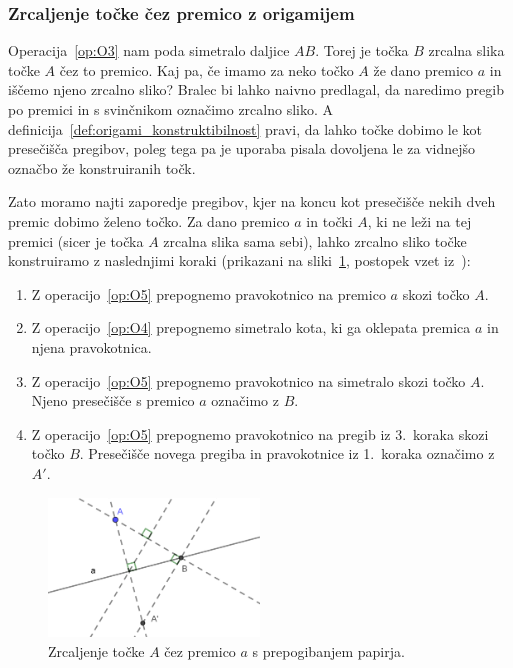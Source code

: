 \subsubsection{Zrcaljenje točke čez premico z origamijem}
\label{zrcaljenje_origami}

Operacija~\ref{op:O3} nam poda simetralo daljice $AB$. Torej je točka $B$ zrcalna slika točke $A$ čez to premico. Kaj pa, če imamo za neko točko $A$ že dano premico $a$ in iščemo njeno zrcalno sliko? Bralec bi lahko naivno predlagal, da naredimo pregib po premici in s svinčnikom označimo zrcalno sliko. A definicija~\ref{def:origami_konstruktibilnost} pravi, da lahko točke dobimo le kot presečišča pregibov, poleg tega pa je uporaba pisala dovoljena le za vidnejšo označbo že konstruiranih točk.

Zato moramo najti zaporedje pregibov, kjer na koncu kot presečišče nekih dveh premic dobimo želeno točko. Za dano premico $a$ in točki $A$, ki ne leži na tej premici (sicer je točka $A$ zrcalna slika sama sebi), lahko zrcalno sliko točke konstruiramo z naslednjimi koraki (prikazani na sliki~\ref{fig:zrcaljenje_cez_premico}, postopek vzet iz~\cite[str.\ 28]{hull2020}):
\begin{enumerate}
    \item Z operacijo~\ref{op:O5} prepognemo pravokotnico na premico $a$ skozi točko $A$.
    \item Z operacijo~\ref{op:O4} prepognemo simetralo kota, ki ga oklepata premica $a$ in njena pravokotnica.
    \item Z operacijo~\ref{op:O5} prepognemo pravokotnico na simetralo skozi točko $A$. Njeno presečišče s premico $a$ označimo z $B$.
    \item Z operacijo~\ref{op:O5} prepognemo pravokotnico na pregib iz 3.\ koraka skozi točko $B$. Presečišče novega pregiba in pravokotnice iz 1.\ koraka označimo z $A'$.
\end{enumerate}

\begin{figure}[h]
    \centering
    \includegraphics[width=0.5\textwidth]{images/zrcaljenje_tocke_cez_premico.png}
    \caption[Zrcaljenje čez premico]{Zrcaljenje točke $A$ čez premico $a$ s prepogibanjem papirja.}
    \label{fig:zrcaljenje_cez_premico}
\end{figure}

